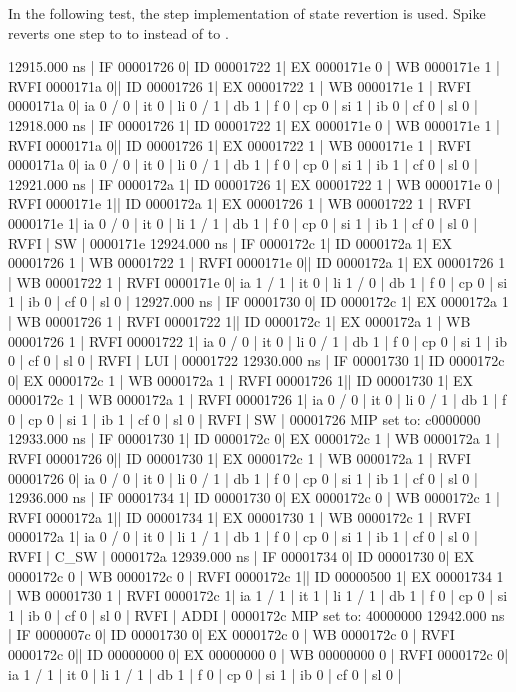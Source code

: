 In the following test, the step implementation of state revertion is used. Spike reverts one step to to  instead of to .
\begin{terminal}
   12915.000 ns | IF 00001726  0| ID 00001722 1| EX 0000171e 0 | WB 0000171e 1 | RVFI 0000171a 0|| ID 00001726  1| EX 00001722 1 | WB 0000171e 1 | RVFI 0000171a 0| ia 0 / 0 | it 0 |  li 0 / 1 | db 1 | f 0 | cp 0 | si 1 | ib 0 | cf 0 | sl 0 |
   12918.000 ns | IF 00001726  1| ID 00001722 1| EX 0000171e 0 | WB 0000171e 1 | RVFI 0000171a 0|| ID 00001726  1| EX 00001722 1 | WB 0000171e 1 | RVFI 0000171a 0| ia 0 / 0 | it 0 |  li 0 / 1 | db 1 | f 0 | cp 0 | si 1 | ib 1 | cf 0 | sl 0 |
   12921.000 ns | IF 0000172a  1| ID 00001726 1| EX 00001722 1 | WB 0000171e 0 | RVFI 0000171e 1|| ID 0000172a  1| EX 00001726 1 | WB 00001722 1 | RVFI 0000171e 1| ia 0 / 0 | it 0 |  li 1 / 1 | db 1 | f 0 | cp 0 | si 1 | ib 1 | cf 0 | sl 0 | RVFI | SW       | 0000171e
   12924.000 ns | IF 0000172c  1| ID 0000172a 1| EX 00001726 1 | WB 00001722 1 | RVFI 0000171e 0|| ID 0000172a  1| EX 00001726 1 | WB 00001722 1 | RVFI 0000171e 0| ia 1 / 1 | it 0 |  li 1 / 0 | db 1 | f 0 | cp 0 | si 1 | ib 0 | cf 0 | sl 0 |
   12927.000 ns | IF 00001730  0| ID 0000172c 1| EX 0000172a 1 | WB 00001726 1 | RVFI 00001722 1|| ID 0000172c  1| EX 0000172a 1 | WB 00001726 1 | RVFI 00001722 1| ia 0 / 0 | it 0 |  li 0 / 1 | db 1 | f 0 | cp 0 | si 1 | ib 0 | cf 0 | sl 0 | RVFI | LUI      | 00001722
   12930.000 ns | IF 00001730  1| ID 0000172c 0| EX 0000172c 1 | WB 0000172a 1 | RVFI 00001726 1|| ID 00001730  1| EX 0000172c 1 | WB 0000172a 1 | RVFI 00001726 1| ia 0 / 0 | it 0 |  li 0 / 1 | db 1 | f 0 | cp 0 | si 1 | ib 1 | cf 0 | sl 0 | RVFI | SW       | 00001726
MIP set to: c0000000
   12933.000 ns | IF 00001730  1| ID 0000172c 0| EX 0000172c 1 | WB 0000172a 1 | RVFI 00001726 0|| ID 00001730  1| EX 0000172c 1 | WB 0000172a 1 | RVFI 00001726 0| ia 0 / 0 | it 0 |  li 0 / 1 | db 1 | f 0 | cp 0 | si 1 | ib 1 | cf 0 | sl 0 |
   12936.000 ns | IF 00001734  1| ID 00001730 0| EX 0000172c 0 | WB 0000172c 1 | RVFI 0000172a 1|| ID 00001734  1| EX 00001730 1 | WB 0000172c 1 | RVFI 0000172a 1| ia 0 / 0 | it 0 |  li 1 / 1 | db 1 | f 0 | cp 0 | si 1 | ib 1 | cf 0 | sl 0 | RVFI | C_SW     | 0000172a
   12939.000 ns | IF 00001734  0| ID 00001730 0| EX 0000172c 0 | WB 0000172c 0 | RVFI 0000172c 1|| ID 00000500  1| EX 00001734 1 | WB 00001730 1 | RVFI 0000172c 1| ia 1 / 1 | it 1 |  li 1 / 1 | db 1 | f 0 | cp 0 | si 1 | ib 0 | cf 0 | sl 0 | RVFI | ADDI     | 0000172c
MIP set to: 40000000
   12942.000 ns | IF 0000007c  0| ID 00001730 0| EX 0000172c 0 | WB 0000172c 0 | RVFI 0000172c 0|| ID 00000000  0| EX 00000000 0 | WB 00000000 0 | RVFI 0000172c 0| ia 1 / 1 | it 0 |  li 1 / 1 | db 1 | f 0 | cp 0 | si 1 | ib 0 | cf 0 | sl 0 |

\end{terminal}
